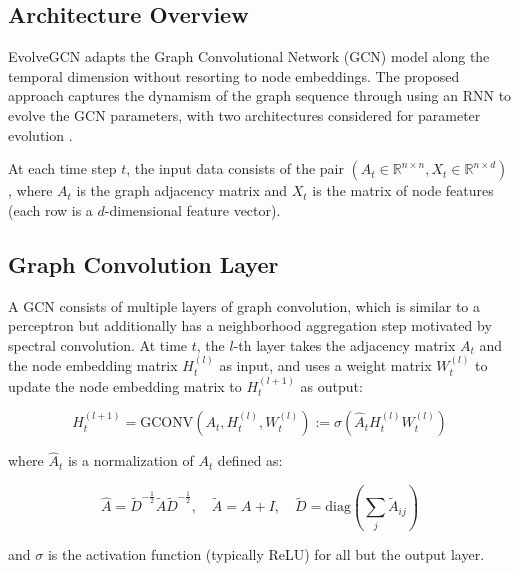 \subsection*{Architecture Overview}

EvolveGCN adapts the Graph Convolutional Network (GCN) model along the temporal dimension without resorting to node embeddings. The proposed approach captures the dynamism of the graph sequence through using an RNN to evolve the GCN parameters, with two architectures considered for parameter evolution \cite{parejaEvolveGCNEvolvingGraph2020}.

At each time step $t$, the input data consists of the pair $(A_t \in \mathbb{R}^{n \times n}, X_t \in \mathbb{R}^{n \times d})$, where $A_t$ is the graph adjacency matrix and $X_t$ is the matrix of node features (each row is a $d$-dimensional feature vector).

\subsection*{Graph Convolution Layer}

A GCN consists of multiple layers of graph convolution, which is similar to a perceptron but additionally has a neighborhood aggregation step motivated by spectral convolution. At time $t$, the $l$-th layer takes the adjacency matrix $A_t$ and the node embedding matrix $H_t^{(l)}$ as input, and uses a weight matrix $W_t^{(l)}$ to update the node embedding matrix to $H_t^{(l+1)}$ as output:

\begin{equation}
	H_t^{(l+1)} = \text{GCONV}(A_t, H_t^{(l)}, W_t^{(l)}) := \sigma(\hat{A}_t H_t^{(l)} W_t^{(l)})
\end{equation}

where $\hat{A}_t$ is a normalization of $A_t$ defined as:

\begin{equation}
	\hat{A} = \tilde{D}^{-\frac{1}{2}} \tilde{A} \tilde{D}^{-\frac{1}{2}}, \quad \tilde{A} = A + I, \quad \tilde{D} = \text{diag}\left(\sum_j \tilde{A}_{ij}\right)
\end{equation}

and $\sigma$ is the activation function (typically ReLU) for all but the output layer. 

